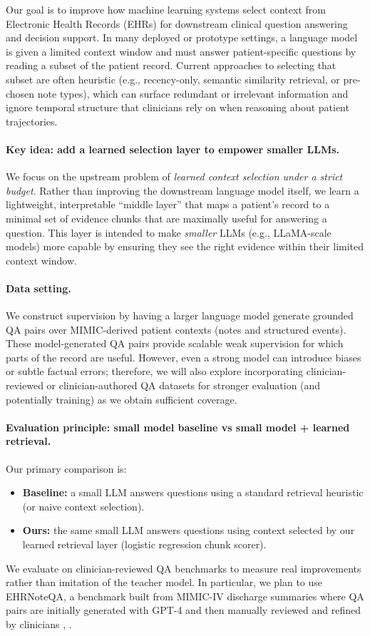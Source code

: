 Our goal is to improve how machine learning systems select context from Electronic Health Records (EHRs) for downstream clinical question answering and decision support. In many deployed or prototype settings, a language model is given a limited context window and must answer patient-specific questions by reading a subset of the patient record. Current approaches to selecting that subset are often heuristic (e.g., recency-only, semantic similarity retrieval, or pre-chosen note types), which can surface redundant or irrelevant information and ignore temporal structure that clinicians rely on when reasoning about patient trajectories.

\paragraph{Key idea: add a learned selection layer to empower smaller LLMs.}
We focus on the upstream problem of \emph{learned context selection under a strict budget}. Rather than improving the downstream language model itself, we learn a lightweight, interpretable ``middle layer'' that maps a patient's record to a minimal set of evidence chunks that are maximally useful for answering a question. This layer is intended to make \emph{smaller} LLMs (e.g., LLaMA-scale models) more capable by ensuring they see the right evidence within their limited context window.


\paragraph{Data setting.}
We construct supervision by having a larger language model generate grounded QA pairs over MIMIC-derived patient contexts (notes and structured events). These model-generated QA pairs provide scalable weak supervision for which parts of the record are useful. However, even a strong model can introduce biases or subtle factual errors; therefore, we will also explore incorporating clinician-reviewed or clinician-authored QA datasets for stronger evaluation (and potentially training) as we obtain sufficient coverage.

\paragraph{Evaluation principle: small model baseline vs small model + learned retrieval.}
Our primary comparison is:
\begin{itemize}
    \item \textbf{Baseline:} a small LLM answers questions using a standard retrieval heuristic (or naive context selection).
    \item \textbf{Ours:} the same small LLM answers questions using context selected by our learned retrieval layer (logistic regression chunk scorer).
\end{itemize}
We evaluate on clinician-reviewed QA benchmarks to measure real improvements rather than imitation of the teacher model. In particular, we plan to use EHRNoteQA, a benchmark built from MIMIC-IV discharge summaries where QA pairs are initially generated with GPT-4 and then manually reviewed and refined by clinicians \citep{ehrnoteqa_physionet_101},
\citep{johnson_mimiciv}.
 


